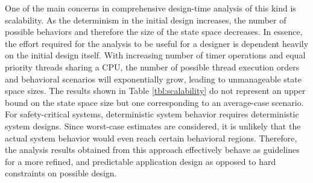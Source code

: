 One of the main concerns in comprehensive design-time analysis of this kind is scalability. As the determinism in the initial design increases, the number of possible behaviors and therefore the size of the state space decreases. In essence, the effort required for the analysis to be useful for a designer is dependent heavily on the initial design itself. With increasing number of timer operations and equal priority threads sharing a CPU, the number of possible thread execution orders and behavioral scenarios will exponentially grow, leading to unmanageable state space sizes. The results shown in Table \ref{tbl:scalability} do not represent an upper bound on the state space size but one corresponding to an average-case scenario. For safety-critical systems, deterministic system behavior requires deterministic system designs. Since worst-case estimates are considered, it is unlikely that the actual system behavior would even reach certain behavioral regions. Therefore, the analysis results obtained from this approach effectively behave as guidelines for a more refined, and predictable application design as opposed to hard constraints on possible design.  
